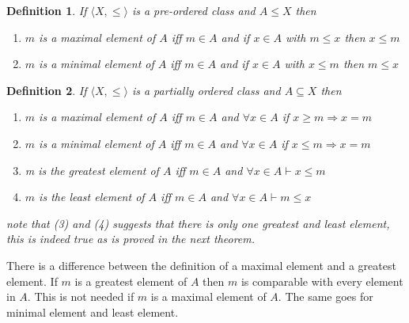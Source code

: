 \documentclass{book}
\newtheorem{definition}{Definition}
{\theorembodyfont{\rmfamily}\newtheorem{example}{Example}}
\begin{document}
{{\begin{definition}
  \label{maximal (minimal element in a pre-ordered class}If $\langle X,
  \leqslant \rangle$ is a pre-ordered class and $A \leqslant X$ then
  \begin{enumerate}
    \item $m$ is a maximal element of $A$ iff $m \in A$ and if $x \in A$ with
    $m \leqslant x$ then $x \leqslant m$
    
    \item $m$ is a minimal element of $A$ iff $m \in A$ and if $x \in A$ with
    $x \leqslant m$ then $m \leqslant x$
  \end{enumerate}
\end{definition}

\begin{definition}
  \label{maximal, minimal, greatest, least}{}{}{}{}If $\langle X, \leqslant \rangle$ is a partially ordered class and
  $A \subseteq X$ then
  \begin{enumerate}
    \item $m$ is a maximal element of $A$ iff $m \in A$ and $\forall x \in A$
    if $x \geqslant m \Rightarrow x = m$
    
    \item $m$ is a minimal element of $A$ iff $m \in A$ and $\forall x \in A$
    if $x \leqslant m \Rightarrow x = m$
    
    \item m is the greatest element of $A$ iff $m \in A$ and $\forall x \in A
    \vdash x \leqslant m$
    
    \item $m$ is the least element of $A$ iff $m \in A$ and $\forall x \in A
    \vdash m \leqslant x$
  \end{enumerate}
  note that (3) and (4) suggests that there is only one greatest and least
  element, this is indeed true as is proved in the next theorem.
\end{definition}

\begin{note}
  There is a difference between the definition of a maximal element and a
  greatest element. If $m$ is a greatest element of $A$ then $m$ is comparable
  with every element in $A$. This is not needed if $m$ is a maximal element of
  $A$. The same goes for minimal element and least element.
\end{note}

}}
\end{document}
